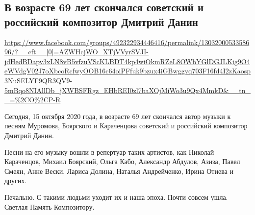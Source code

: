  

 

\subsection{В возрасте 69 лет скончался советский и российский композитор Дмитрий Данин}
\label{sec:15_10_2020.fb.oleg_rostovcev.1_danin_death}

\url{https://www.facebook.com/groups/492322934446416/permalink/1303200053358696/?__cft__[0]=AZWHcjWO_XTjVVyrSVJI-jdHedBDapv3xLN8vB5vfzuVScKLBDT4kp4wiOkmRZeL8OWbYGlDGJLKig9O4eWVdgV02J7oXbcoRcfwyOOB16c64oiPFfuk9bzux4iGBwggvq703F16fd4I2zKaosp3NuSELYF9QR3QV9-5mBqo8NIAllDb_jXWBSFRgz_EHbREI0zl7baXOjMiWo3u9Qx4MmkD&__tn__=%2CO%2CP-R}

Сегодня, 15 октября 2020 года, в возрасте 69 лет скончался автор музыки к
песням Муромова, Боярского и Караченцова советский и российский композитор
Дмитрий Данин.  

Песни на его музыку вошли в репертуар таких артистов, как Николай Караченцов,
Михаил Боярский, Ольга Кабо, Александр Абдулов, Азиза, Павел Смеян, Анне Вески,
Лариса Долина, Наталья Андрейченко, Ирина Отиева и других.

Печально. С такими людьми уходит их и наша эпоха. Почти совсем ушла. Светлая Память Композитору.


